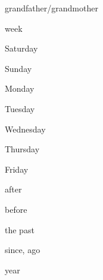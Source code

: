 \documentclass[avery5371,grid,frame]{flashcards}
\begin{document}
\begin{flashcard}{\LARGE grandfather/grandmother}
\LARGE {}
\end{flashcard}
\begin{flashcard}{\LARGE week}
\LARGE {}
\end{flashcard}
\begin{flashcard}{\LARGE Saturday}
\LARGE {}
\end{flashcard}
\begin{flashcard}{\LARGE Sunday}
\LARGE {}
\end{flashcard}
\begin{flashcard}{\LARGE Monday}
\LARGE {}
\end{flashcard}
\begin{flashcard}{\LARGE Tuesday}
\LARGE {}
\end{flashcard}
\begin{flashcard}{\LARGE Wednesday}
\LARGE {}
\end{flashcard}
\begin{flashcard}{\LARGE Thursday}
\LARGE {}
\end{flashcard}
\begin{flashcard}{\LARGE Friday}
\LARGE {}
\end{flashcard}
\begin{flashcard}{\LARGE after}
\LARGE {}
\end{flashcard}
\begin{flashcard}{\LARGE before}
\LARGE {}
\end{flashcard}
\begin{flashcard}{\LARGE the past}
\LARGE {}
\end{flashcard}
\begin{flashcard}{\LARGE since, ago}
\LARGE {}
\end{flashcard}
\begin{flashcard}{\LARGE year}
\LARGE {}
\end{flashcard}
\end{document}
